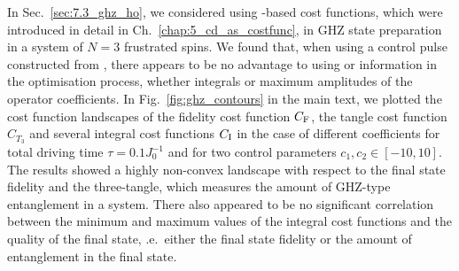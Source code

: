 In Sec.~\ref{sec:7.3_ghz_ho}, we considered using -based cost functions, which were introduced in detail in Ch.~\ref{chap:5_cd_as_costfunc}, in GHZ state preparation in a system of $N=3$ frustrated spins. We found that, when using a control pulse constructed from , there appears to be no advantage to using  or   information in the optimisation process, whether integrals or maximum amplitudes of the operator coefficients. In Fig.~\ref{fig:ghz_contours} in the main text, we plotted the cost function landscapes of the fidelity cost function $C_{\rm F}$, the tangle cost function $C_{T_3}$ and several integral cost functions $C_{\rm I}$ in the case of different  coefficients for total driving time $\tau = 0.1J_0^{-1}$ and for two control parameters $c_1, c_2 \in [-10,10]$. The results showed a highly non-convex landscape with respect to the final state fidelity and the three-tangle, which measures the amount of GHZ-type entanglement in a system. There also appeared to be no significant correlation between the minimum and maximum values of the integral cost functions and the quality of the final state, \@i.e.~either the final state fidelity or the amount of entanglement in the final state. 

